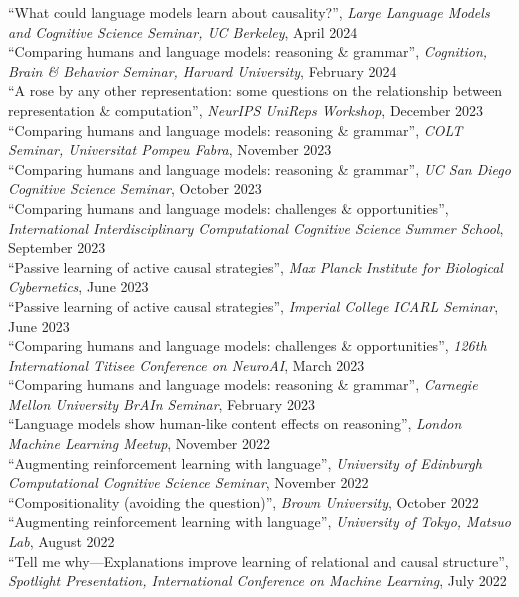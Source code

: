 \documentclass[margin]{res}
\begin{document}
\begin{resume}
{``What could language models learn about causality?'',} \textit{Large Language Models and Cognitive Science Seminar, UC Berkeley}, April 2024\\[3pt] 
{``Comparing humans and language models: reasoning \& grammar'',} \textit{Cognition, Brain \& Behavior Seminar, Harvard University}, February 2024\\[3pt] 
{``A rose by any other representation: some questions on the relationship between representation \& computation'',} \textit{NeurIPS UniReps Workshop}, December 2023\\[3pt] 
{``Comparing humans and language models: reasoning \& grammar'',} \textit{COLT Seminar, Universitat Pompeu Fabra}, November 2023\\[3pt] 
{``Comparing humans and language models: reasoning \& grammar'',} \textit{UC San Diego Cognitive Science Seminar}, October 2023\\[3pt] 
{``Comparing humans and language models: challenges \& opportunities'',} \textit{International Interdisciplinary Computational Cognitive Science Summer School}, September 2023\\[3pt] 
{``Passive learning of active causal strategies'',} \textit{Max Planck Institute for Biological Cybernetics}, June 2023\\[3pt]
{``Passive learning of active causal strategies'',} \textit{Imperial College ICARL Seminar}, June 2023\\[3pt]
{``Comparing humans and language models: challenges \& opportunities'',} \textit{126th International Titisee Conference on NeuroAI}, March 2023\\[3pt] 
{``Comparing humans and language models: reasoning \& grammar'',} \textit{Carnegie Mellon University BrAIn Seminar}, February 2023\\[3pt] 
{``Language models show human-like content effects on reasoning'',} \textit{London Machine Learning Meetup}, November 2022\\[3pt] 
{``Augmenting reinforcement learning with language'',} \textit{University of Edinburgh Computational Cognitive Science Seminar}, November 2022\\[3pt] 
{``Compositionality (avoiding the question)'',} \textit{Brown University}, October 2022\\[3pt] 
{``Augmenting reinforcement learning with language'',} \textit{University of Tokyo, Matsuo Lab}, August 2022\\[3pt] 
{``Tell me why---Explanations improve learning of relational and causal structure'',} \textit{Spotlight Presentation, International Conference on Machine Learning}, July 2022\\[3pt] 

\end{resume}
\end{document}
